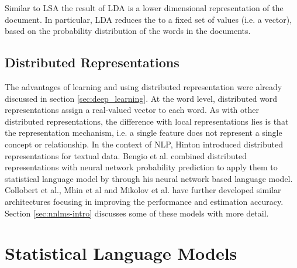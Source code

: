 Similar to \ac{LSA} the result of \ac{LDA} is a lower dimensional
representation of the document. In particular, LDA
reduces the  to a fixed set of values  (i.e. a vector),  based on the
probability distribution of the words in the documents.

 \subsection{Distributed Representations}
 \label{sec:dis_rep}
The  advantages of  learning and using  distributed representation were already discussed in section \ref{sec:deep_learning}.
At the word level, distributed word representations assign a real-valued vector
to each word. As with other distributed representations, the  difference with
local representations lies  is that the representation mechanism, i.e. a single 
feature does not represent a single concept or relationship.
In the context of \ac{NLP}, Hinton  \cite{hinton:learndistrep} introduced distributed representations for textual data. 
 Bengio et al. \cite{Bengio:2008} combined distributed representations with neural network probability prediction  to apply them  to
statistical language model by through his
neural network based language model. Collobert  et al.\cite{collobert:2008}, Mhin et
al \cite{Mnih08ascalable} and
Mikolov et al.  \cite{conf/interspeech/MikolovKBCK10,conf/icassp/MikolovKBGC09} have further developed similar architectures focusing in improving the performance and estimation accuracy. Section \ref{sec:nnlms-intro} discusses some of these models with more detail.










\section{Statistical Language Models}
\label{sec:relwork-language-models}

